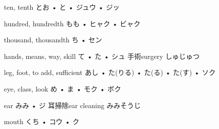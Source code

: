 



\setcounter{cardnum}{17}

		{ten, tenth}
		{とお • と • ジュウ • ジッ}
		{}{}
		{}{}
		{}{}
		{}{}
		{}{}

		{hundred, hundredth}
		{もも • ヒャク • ビャク}
		{}{}
		{}{}
		{}{}
		{}{}
		{}{}

		{thousand, thousandth}
		{ち • セン}
		{}{}
		{}{}
		{}{}
		{}{}
		{}{}

		{hands, means, way, skill}
		{て • た • シュ}
		{手術}{surgery しゅじゅつ}
		{}{}
		{}{}
		{}{}
		{}{}

		{leg, foot, to add, sufficient}
		{あし • た(りる) • た(る) • た(す) • ソク}
		{}{}
		{}{}
		{}{}
		{}{}
		{}{}

		{eye, class, look}
		{め • ま • モク • ボク}
		{}{}
		{}{}
		{}{}
		{}{}
		{}{}

		{ear}
		{みみ • ジ}
		{耳掃除}{ear cleaning みみそうじ}
		{}{}
		{}{}
		{}{}
		{}{}

		{mouth}
		{くち • コウ • ク}
		{}{}
		{}{}
		{}{}
		{}{}
		{}{}

